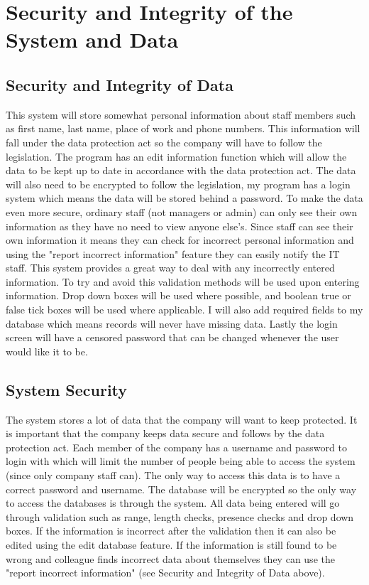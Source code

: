 \newpage

\section{Security and Integrity of the System and Data}

\subsection{Security and Integrity of Data}

This system will store somewhat personal information about staff members such as first name, last name, place of work and phone numbers. This information will fall under the data protection act so the company will have to follow the legislation. The program has an edit information function which will allow the data to be kept up to date in accordance with the data protection act. The data will also need to be encrypted to follow the legislation, my program has a login system which means the data will be stored behind a password. To make the data even more secure, ordinary staff (not managers or admin) can only see their own information as they have no need to view anyone else's. Since staff can see their own information it means they can check for incorrect personal information and using the "report incorrect information" feature they can easily notify the IT staff. This system provides a great way to deal with any incorrectly entered information. To try and avoid this validation methods will be used upon entering information. Drop down boxes will be used where possible, and boolean true or false tick boxes will be used where applicable. I will also add required fields to my database which means records will never have missing data. Lastly the login screen will have a censored password that can be changed whenever the user would like it to be.

\subsection{System Security}

The system stores a lot of data that the company will want to keep protected. It is important that the company keeps data secure and follows by the data protection act. Each member of the company has a username and password to login with which will limit the number of people being able to access the system (since only company staff can). The only way to access this data is to have a correct password and username. The database will be encrypted so the only way to access the databases is through the system. All data being entered will go through validation such as range, length checks, presence checks and drop down boxes. If the information is incorrect after the validation then it can also be edited using the edit database feature. If the information is still found to be wrong and colleague finds incorrect data about themselves they can use the "report incorrect information" (see Security and Integrity of Data above).

